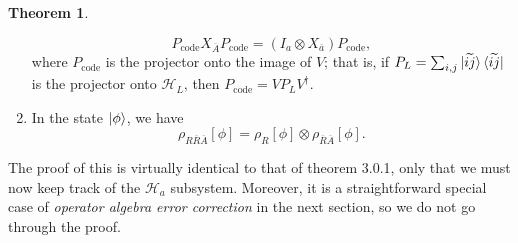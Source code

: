 \documentclass[12pt,a4paper]{report}
\numberwithin{equation}{section}
\newcommand{\ketbra}[2]{\ket{#1}\bra{#2}}
\newcommand{\ketbras}[1]{\ketbra{#1}{#1}}
\newcommand{\Pc}{P_{\text{code}}}
\newcommand{\ol}[1]{\overline{#1}}
\theoremstyle{definition}
\theoremstyle{theorem}
\newtheorem{theorem}{Theorem}[section]
\theoremstyle{theorem}
\theoremstyle{example}
\theoremstyle{definition}
\begin{document}
\begin{theorem}
\begin{enumerate}
		\begin{equation}\label{S3}
			\Pc X_{\ol{A}}\Pc=(I_{a}\otimes X_{\ol{a}})\Pc,
		\end{equation}
		where $\Pc$ is the projector onto the image of $V$; that is, if $P_{L}=\sum_{i,j}\ketbras{\widetilde{ij}}$ is the projector onto $\mathcal{H}_{L}$, then $\Pc=VP_{L}V^{\dagger}$.
		\item In the state $\ket{\phi}$, we have
		\begin{equation}\label{S4}
			\rho_{R\ol{R}\ol{A}}[\phi]=\rho_{R}[\phi]\otimes\rho_{\ol{R}\ol{A}}[\phi].
		\end{equation}
	\end{enumerate}
\end{theorem}
The proof of this is virtually identical to that of theorem 3.0.1, only that we must now keep track of the $\mathcal{H}_{a}$ subsystem. Moreover, it is a straightforward special case of \textit{operator algebra error correction} in the next section, so we do not go through the proof.
\end{document}
